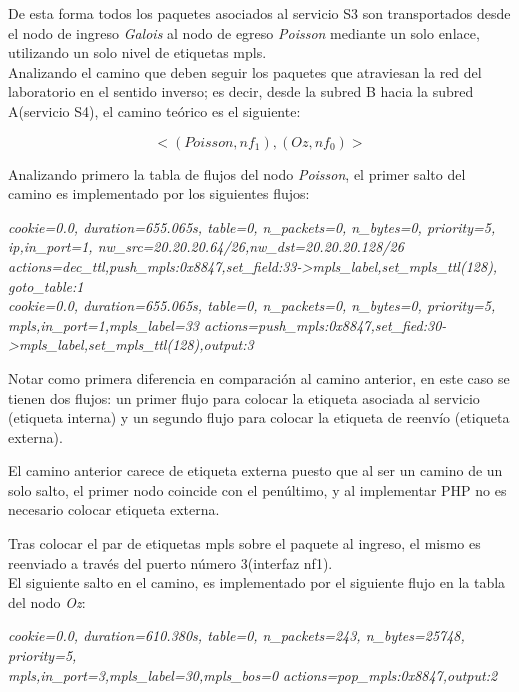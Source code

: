 De esta forma todos los paquetes asociados al servicio S3 son transportados desde el nodo de ingreso \textit{Galois} al nodo de egreso \textit{Poisson} mediante un solo enlace, utilizando un solo nivel de etiquetas mpls.\\

Analizando el camino que deben seguir los paquetes que atraviesan la red del laboratorio en el sentido inverso; es decir, desde la subred B hacia la subred A(servicio S4), el camino teórico es el siguiente:

$$<(Poisson, nf_1), (Oz, nf_0)>$$ 

Analizando primero la tabla de flujos del nodo \textit{Poisson}, el primer salto del camino es implementado por los siguientes flujos:

\begin{center}
\textit{cookie=0.0, duration=655.065s, table=0, n\_packets=0, n\_bytes=0, priority=5, \\
ip,in\_port=1, nw\_src=20.20.20.64/26,nw\_dst=20.20.20.128/26 \\
actions=dec\_ttl,push\_mpls:0x8847,set\_field:33->mpls\_label,set\_mpls\_ttl(128), goto\_table:1 \\
cookie=0.0, duration=655.065s, table=0, n\_packets=0, n\_bytes=0, priority=5, \\
mpls,in\_port=1,mpls\_label=33 actions=push\_mpls:0x8847,set\_fied:30->mpls\_label,set\_mpls\_ttl(128),output:3
}
\end{center}

Notar como primera diferencia en comparación al camino anterior, en este caso se tienen dos flujos: un primer flujo para colocar la etiqueta asociada al servicio (etiqueta interna) y un segundo flujo para colocar la etiqueta de reenvío (etiqueta externa). 

El camino anterior carece de etiqueta externa puesto que al ser un camino de un solo salto, el primer nodo coincide con el pen\'ultimo, y al implementar PHP no es necesario colocar etiqueta externa. 

Tras colocar el par de etiquetas mpls sobre el paquete al ingreso, el mismo es reenviado a trav\'es del puerto n\'umero 3(interfaz nf1).\\

El siguiente salto en el camino, es implementado por el siguiente flujo en la tabla del nodo \textit{Oz}:

\begin{center}
\textit{cookie=0.0, duration=610.380s, table=0, n\_packets=243, n\_bytes=25748, priority=5, \\
mpls,in\_port=3,mpls\_label=30,mpls\_bos=0 actions=pop\_mpls:0x8847,output:2 }
\end{center}

